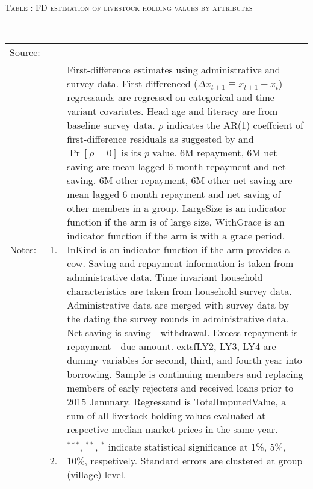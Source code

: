 \hspace{-1cm}\begin{minipage}[t]{14cm}
\hfil\textsc{\normalsize Table \thetable: FD estimation of livestock holding values by attributes\label{tab FD livestock attributes original HH}}\\
\setlength{\tabcolsep}{1pt}
\setlength{\baselineskip}{8pt}
\renewcommand{\arraystretch}{.55}
\hfil{}\\
\renewcommand{\arraystretch}{.8}
\setlength{\tabcolsep}{1pt}
\begin{tabular}{>{\hfill\scriptsize}p{1cm}<{}>{\hfill\scriptsize}p{.25cm}<{}>{\scriptsize}p{12cm}<{\hfill}}
Source:& \multicolumn{2}{l}{\scriptsize Estimated with GUK administrative and survey data.}\\
Notes: & 1. & First-difference estimates using administrative and survey data. First-differenced ($\Delta x_{t+1}\equiv x_{t+1} - x_{t}$) regressands are regressed on categorical and time-variant covariates. Head age and literacy are from baseline survey data. $\rho$ indicates the AR(1) coeffcient of first-difference residuals as suggested by \citet[][10.71]{Wooldridge2010} and $\Pr[\rho=0]$ is its $p$ value. \textsf{6M repayment, 6M net saving} are mean lagged 6 month repayment and net saving. \textsf{6M other repayment, 6M other net saving} are mean lagged 6 month repayment and net saving of other members in a group. \textsf{LargeSize} is an indicator function if the arm is of large size, \textsf{WithGrace} is an indicator function if the arm is with a grace period, \textsf{InKind} is an indicator function if the arm provides a cow. Saving and repayment information is taken from administrative data. Time invariant household characteristics are taken from household survey data. Administrative data are merged with survey data by the dating the survey rounds in administrative data. Net saving is saving - withdrawal. Excess repayment is repayment - due amount. 	extsf{LY2, LY3, LY4} are dummy variables for second, third, and fourth year into borrowing. Sample is continuing members and replacing members of early rejecters and received loans prior to 2015 Janunary. Regressand is \textsf{TotalImputedValue}, a sum of all livestock holding values evaluated at respective median market prices in the same year. \\
& 2. & ${}^{***}$, ${}^{**}$, ${}^{*}$ indicate statistical significance at 1\%, 5\%, 10\%, respetively. Standard errors are clustered at group (village) level.
\end{tabular}
\end{minipage}



